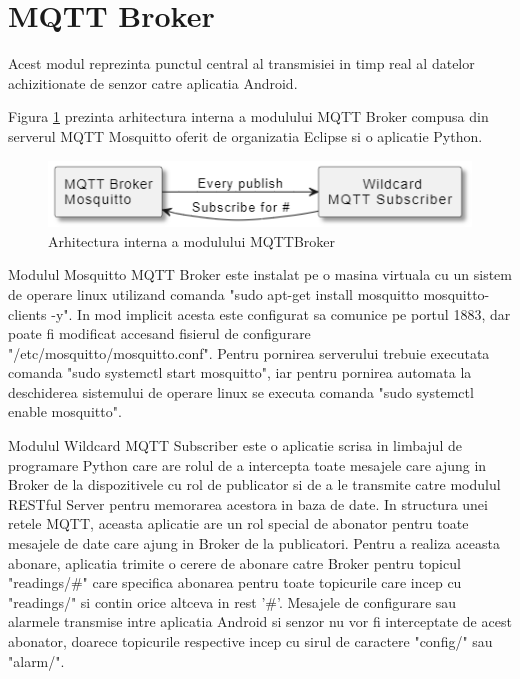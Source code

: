 \section{MQTT Broker}\label{sec:pi_mqttbroker}
Acest modul reprezinta punctul central al transmisiei in timp real al datelor achizitionate de senzor catre aplicatia Android.

Figura \ref{fig:MQTTBrokerInside} prezinta arhitectura interna a modulului MQTT Broker compusa din serverul MQTT Mosquitto oferit de organizatia Eclipse si o aplicatie 
Python.
\begin{figure}[H]
    \centering
    \includegraphics[scale=0.8]{figs/MQTTBrokerInside.png}
    \caption{Arhitectura interna a modulului MQTTBroker}
    \label{fig:MQTTBrokerInside}
\end{figure}

Modulul Mosquitto MQTT Broker este instalat pe o masina virtuala cu un sistem de operare linux utilizand comanda "sudo apt-get install mosquitto mosquitto-clients -y". 
In mod implicit acesta este configurat sa comunice pe portul 1883, dar poate fi modificat accesand fisierul de configurare "/etc/mosquitto/mosquitto.conf". Pentru 
pornirea serverului trebuie executata comanda "sudo systemctl start mosquitto", iar pentru pornirea automata la deschiderea sistemului de operare linux se executa 
comanda "sudo systemctl enable mosquitto".

Modulul Wildcard MQTT Subscriber este o aplicatie scrisa in limbajul de programare Python care are rolul de a intercepta toate mesajele care ajung in Broker de la dispozitivele 
cu rol de publicator si de a le transmite catre modulul RESTful Server pentru memorarea acestora in baza de date. In structura unei retele MQTT, aceasta aplicatie are un rol 
special de abonator pentru toate mesajele de date care ajung in Broker de la publicatori. Pentru a realiza aceasta abonare, aplicatia trimite o cerere de abonare catre 
Broker pentru topicul "readings/\#" care specifica abonarea pentru toate topicurile care incep cu "readings/" si contin orice altceva in rest '\#'. Mesajele de configurare 
sau alarmele transmise intre aplicatia Android si senzor nu vor fi interceptate de acest abonator, doarece topicurile respective incep cu sirul de caractere "config/" sau 
"alarm/".

